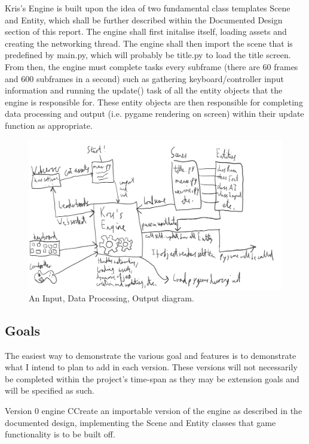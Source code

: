 \documentclass{article}
\begin{document}
Kris's Engine is built upon the idea of two fundamental class templates Scene and Entity, which shall be further described within the Documented Design section of this report. The engine shall first initalise itself, loading assets and creating the networking thread. The engine shall then import the scene that is predefined by main.py, which will probably be title.py to load the title screen. From then, the engine must complete tasks every subframe (there are 60 frames and 600 subframes in a second) such as gathering keyboard/controller input information and running the update() task of all the entity objects that the engine is responsible for. These entity objects are then responsible for completing data processing and output (i.e. pygame rendering on screen) within their update function as appropriate.

\begin{figure}[h]
\centering
\includegraphics[width=1\textwidth]{idpo.png}
\caption{\label{fig:idpo}An Input, Data Processing, Output diagram.}
\end{figure}

\subsection{Goals}

The easiest way to demonstrate the various goal and features is to demonstrate what I intend to plan to add in each version. These versions will not necessarily be completed within the project's time-span as they may be extension goals and will be specified as such.

Version 0 engine
CCreate an importable version of the engine as described in the documented design, implementing the Scene and Entity classes that game functionality is to be built off.
\end{document}
